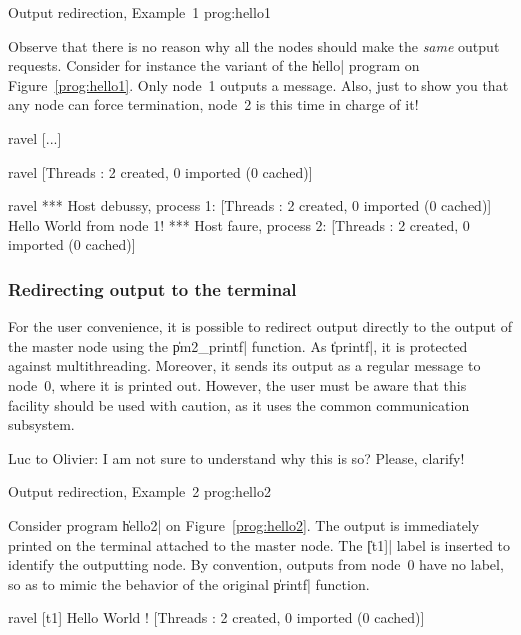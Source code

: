  {Output redirection,
  Example~1} {prog:hello1}

Observe that there is no reason why all the nodes should make the
\emph{same} output requests. Consider for instance the variant of the
\|hello| program on Figure~\ref{prog:hello1}. Only node~1 outputs a
message.  Also, just to show you that any node can force termination,
node~2 is this time in charge of it!
\begin{shell}
ravel%
[...]

ravel%
[Threads : 2 created, 0 imported (0 cached)]

ravel%
*** Host debussy, process 1:
[Threads : 2 created, 0 imported (0 cached)]
Hello World from node 1!
*** Host faure, process 2:
[Threads : 2 created, 0 imported (0 cached)]
\end{shell}

\subsubsection{Redirecting output to the terminal}

For the user convenience, it is possible to redirect output directly
to the output of the master node using the \|pm2_printf| function. As
\|tprintf|, it is protected against multithreading. Moreover, it sends
its output as a regular message to node~0, where it is printed out.
However, the user must be aware that this facility should be used with
caution, as it uses the common communication subsystem. 

\begin{note}
  Luc to Olivier: I am not sure to understand why this is so? Please,
  clarify!
\end{note}

 {Output redirection,
  Example~2} {prog:hello2}

Consider program \|hello2| on Figure~\ref{prog:hello2}. The output is
immediately printed on the terminal attached to the master node. The
\|[t1]| label is inserted to identify the outputting node. By
convention, outputs from node~0 have no label, so as to mimic the
behavior of the original \|printf| function.
\begin{shell}
ravel%
[t1] Hello World !
[Threads : 2 created, 0 imported (0 cached)]
\end{shell}


